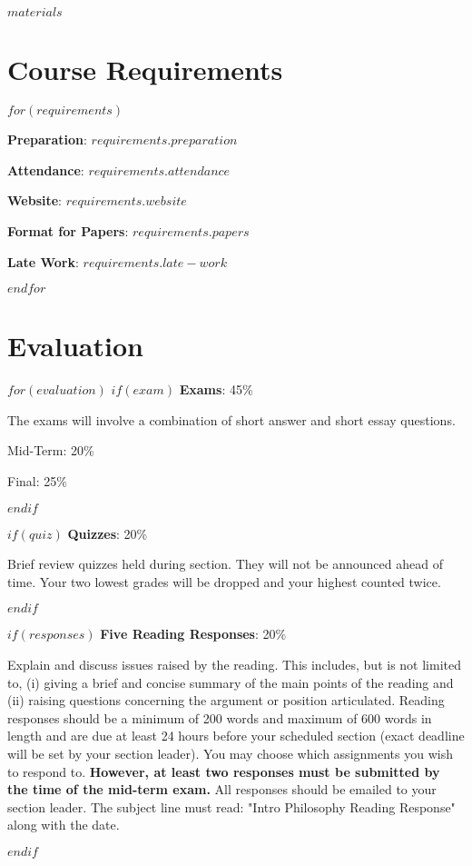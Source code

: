 \documentclass[$fontsize$, letterpaper]{article}
\begin{document}
$materials$

\section*{Course Requirements}
$for(requirements)$
\begin{itemize*}
\item \textbf{Preparation}: $requirements.preparation$
\item \textbf{Attendance}: $requirements.attendance$
\item \textbf{Website}: $requirements.website$
\item \textbf{Format for Papers}: $requirements.papers$
\item \textbf{Late Work}: $requirements.late-work$
\end{itemize*}
$endfor$

\section*{Evaluation}

$for(evaluation)$
$if(exam)$
\textbf{Exams}: 45\%
\begin{itemize*}
\item The exams will involve a combination of short answer and short essay questions.
\begin{itemize*}
\item Mid-Term: 20\%
\item Final: 25\%
\end{itemize*}
\end{itemize*}
$endif$

$if(quiz)$
\textbf{Quizzes}: 20\%
\begin{itemize*}
\item Brief review quizzes held during section. They will not be announced ahead of time. Your two lowest grades will be dropped and your highest counted twice. 
\end{itemize*}
$endif$

$if(responses)$
\textbf{Five Reading Responses}: 20\%
\begin{itemize*}
\item Explain and discuss issues raised by the reading. This includes, but is
  not limited to, (i) giving a brief and concise summary of the main points of
  the reading and (ii) raising questions concerning the argument or position
  articulated. Reading responses should be a minimum of 200 words and maximum of
  600 words in length and are due at least 24 hours before your scheduled
  section (exact deadline will be set by your section leader). You may choose
  which assignments you wish to respond to. \textbf{However, at least two
    responses must be submitted by the time of the mid-term exam.} All responses
  should be emailed to your section leader. The subject line must read: "Intro
  Philosophy Reading Response" along with the date.

\end{itemize*}
$endif$
\end{document}
